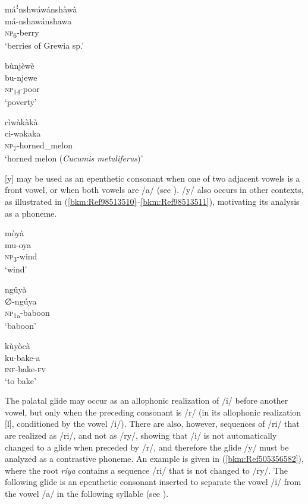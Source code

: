 \ea
\glll máꜝnshwáwánshàwà\\
má-nshawánshawa\\
\textsc{np}\textsubscript{6}-berry\\
\glt ‘berries of Grewia sp.’
\z

\ea
\glll bùnjèwè\\
bu-njewe\\
\textsc{np}\textsubscript{14}-poor\\
\glt ‘poverty’
\z

\ea
\label{bkm:Ref486264205}
\glll cìwàkàkà\\
ci-wakaka\\
\textsc{np}\textsubscript{7}-horned\_melon\\
\glt ‘horned melon (\textit{Cucumis metuliferus})’
\z

[y] may be used as an epenthetic consonant when one of two adjacent vowels is a front vowel, or when both vowels are /a/ (see ). /y/ also occurs in other contexts, as illustrated in (\ref{bkm:Ref98513510}--\ref{bkm:Ref98513511}), motivating its analysis as a phoneme.

\ea
\label{bkm:Ref98513510}
\glll mòyà\\
mu-oya\\
\textsc{np}\textsubscript{3}-wind\\
\glt ‘wind’
\z

\ea
\glll ngûyà\\
∅-ngúya\\
\textsc{np}\textsubscript{1a}-baboon\\
\glt ‘baboon’
\z

\ea
\label{bkm:Ref98513511}
\glll kùyòcà\\
ku-bake-a\\
\textsc{inf}-bake-\textsc{fv}\\
\glt ‘to bake’
\z

The palatal glide may occur as an allophonic realization of /i/ before another vowel, but only when the preceding consonant is /r/ (in its allophonic realization [l], conditioned by the vowel /i/). There are also, however, sequences of /ri/ that are realized as /ri/, and not as /ry/, showing that /i/ is not automatically changed to a glide when preceded by /r/, and therefore the glide /y/ must be analyzed as a contrastive phoneme. An example is given in (\ref{bkm:Ref505356582}), where the root \textit{ríya} contains a sequence /ri/ that is not changed to /ry/. The following glide is an epenthetic consonant inserted to separate the vowel /i/ from the vowel /a/ in the following syllable (see ).

